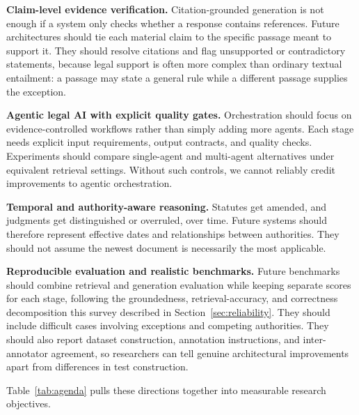 \textbf{Claim-level evidence verification.} Citation-grounded generation is not enough if a system
only checks whether a response contains references. Future architectures should tie each material
claim to the specific passage meant to support it. They should resolve citations and flag
unsupported or contradictory statements, because legal support is often more complex than ordinary
textual entailment: a passage may state a general rule while a different passage supplies the
exception.

\textbf{Agentic legal AI with explicit quality gates.} Orchestration should focus on
evidence-controlled workflows rather than simply adding more agents. Each stage needs explicit input
requirements, output contracts, and quality checks. Experiments should compare single-agent and
multi-agent alternatives under equivalent retrieval settings. Without such controls, we cannot
reliably credit improvements to agentic orchestration.

\textbf{Temporal and authority-aware reasoning.} Statutes get amended, and judgments get
distinguished or overruled, over time. Future systems should therefore represent effective dates and
relationships between authorities. They should not assume the newest document is necessarily the
most applicable.

\textbf{Reproducible evaluation and realistic benchmarks.} Future benchmarks should combine
retrieval and generation evaluation while keeping separate scores for each stage, following the
groundedness, retrieval-accuracy, and correctness decomposition this survey described in
Section~\ref{sec:reliability}. They should include difficult cases involving exceptions and
competing authorities. They should also report dataset construction, annotation instructions, and
inter-annotator agreement, so researchers can tell genuine architectural improvements apart from
differences in test construction.

Table~\ref{tab:agenda} pulls these directions together into measurable research objectives.


